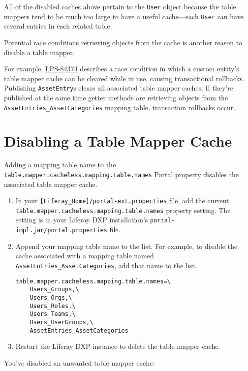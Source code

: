 All of the disabled caches above pertain to the \texttt{User} object
because the table mappers tend to be much too large to have a useful
cache---each \texttt{User} can have several entries in each related
table.

Potential race conditions retrieving objects from the cache is another
reason to disable a table mapper.

For example,
\href{https://issues.liferay.com/browse/LPS-84374}{LPS-84374} describes
a race condition in which a custom entity's table mapper cache can be
cleared while in use, causing transactional rollbacks. Publishing
\texttt{AssetEntry}s clears all associated table mapper caches. If
they're published at the same time getter methods are retrieving objects
from the \texttt{AssetEntries\_AssetCategories} mapping table,
transaction rollbacks occur.

\section{Disabling a Table Mapper
Cache}\label{disabling-a-table-mapper-cache}

Adding a mapping table name to the
\texttt{table.mapper.cacheless.mapping.table.names} Portal property
disables the associated table mapper cache.

\begin{enumerate}
\def\labelenumi{\arabic{enumi}.}
\item
  In your
  \href{/docs/7-1/deploy/-/knowledge_base/d/liferay-home}{\texttt{{[}Liferay\_Home{]}/portal-ext.properties}
  file}, add the current
  \texttt{table.mapper.cacheless.mapping.table.names} property setting.
  The setting is in your Liferay DXP installation's
  \texttt{portal-impl.jar/portal.properties} file.
\item
  Append your mapping table name to the list. For example, to disable
  the cache associated with a mapping table named
  \texttt{AssetEntries\_AssetCategories}, add that name to the list.

\begin{verbatim}
table.mapper.cacheless.mapping.table.names=\
    Users_Groups,\
    Users_Orgs,\
    Users_Roles,\
    Users_Teams,\
    Users_UserGroups,\
    AssetEntries_AssetCategories
\end{verbatim}
\item
  Restart the Liferay DXP instance to delete the table mapper cache.
\end{enumerate}

You've disabled an unwanted table mapper cache.

